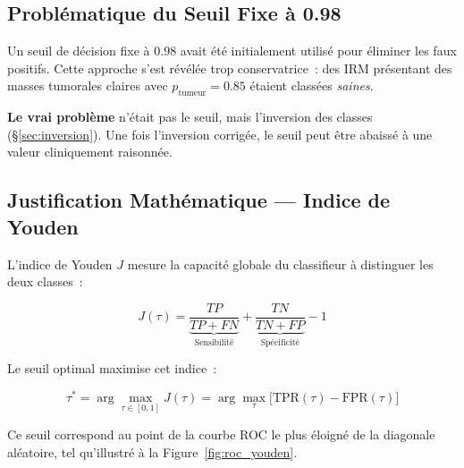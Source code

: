 \documentclass[12pt, a4paper]{report}
\begin{document}
\subsection{Problématique du Seuil Fixe à 0.98}

Un seuil de décision fixe à \(0.98\) avait été initialement utilisé
pour éliminer les faux positifs. Cette approche s'est révélée trop
conservatrice~: des IRM présentant des masses tumorales claires avec
\(p_{\text{tumeur}} = 0.85\) étaient classées \textit{saines}.

\textbf{Le vrai problème} n'était pas le seuil, mais l'inversion des
classes (§\ref{sec:inversion}). Une fois l'inversion corrigée, le seuil
peut être abaissé à une valeur cliniquement raisonnée.

\subsection{Justification Mathématique — Indice de Youden}

L'indice de Youden \(J\) mesure la capacité globale du classifieur
à distinguer les deux classes~:

\begin{equation}
  \label{eq:youden}
  J(\tau) = \underbrace{\frac{TP}{TP + FN}}_{\text{Sensibilité}}
           + \underbrace{\frac{TN}{TN + FP}}_{\text{Spécificité}}
           - 1
\end{equation}

Le seuil optimal maximise cet indice~:

\begin{equation}
  \label{eq:youden_opt}
  \tau^* = \arg\max_{\tau \in [0,1]} J(\tau)
         = \arg\max_{\tau} \bigl[\text{TPR}(\tau) - \text{FPR}(\tau)\bigr]
\end{equation}

Ce seuil correspond au point de la courbe ROC le plus éloigné de la
diagonale aléatoire, tel qu'illustré à la
Figure~\ref{fig:roc_youden}.
\end{document}
